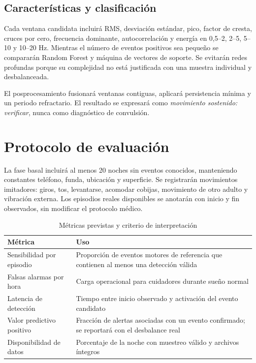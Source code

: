 \documentclass[12pt]{article}
\begin{document}
\subsection{Características y clasificación}

Cada ventana candidata incluirá RMS, desviación estándar, pico, factor de cresta, cruces por cero, frecuencia dominante, autocorrelación y energía en 0,5--2, 2--5, 5--10 y 10--20 Hz. Mientras el número de eventos positivos sea pequeño se compararán Random Forest y máquina de vectores de soporte. Se evitarán redes profundas porque su complejidad no está justificada con una muestra individual y desbalanceada.

El posprocesamiento fusionará ventanas contiguas, aplicará persistencia mínima y un periodo refractario. El resultado se expresará como \textit{movimiento sostenido: verificar}, nunca como diagnóstico de convulsión.

\section{Protocolo de evaluación}

La fase basal incluirá al menos 20 noches sin eventos conocidos, manteniendo constantes teléfono, funda, ubicación y superficie. Se registrarán movimientos imitadores: giros, tos, levantarse, acomodar cobijas, movimiento de otro adulto y vibración externa. Los episodios reales disponibles se anotarán con inicio y fin observados, sin modificar el protocolo médico.

\begin{table}[H]
\centering
\caption{Métricas previstas y criterio de interpretación}
\begin{tabularx}{\textwidth}{>{\raggedright\arraybackslash}p{4cm}X}
\toprule
Métrica & Uso \\
\midrule
Sensibilidad por episodio & Proporción de eventos motores de referencia que contienen al menos una detección válida \\
Falsas alarmas por hora & Carga operacional para cuidadores durante sueño normal \\
Latencia de detección & Tiempo entre inicio observado y activación del evento candidato \\
Valor predictivo positivo & Fracción de alertas asociadas con un evento confirmado; se reportará con el desbalance real \\
Disponibilidad de datos & Porcentaje de la noche con muestreo válido y archivos íntegros \\
\bottomrule
\end{tabularx}
\end{table}
\end{document}
